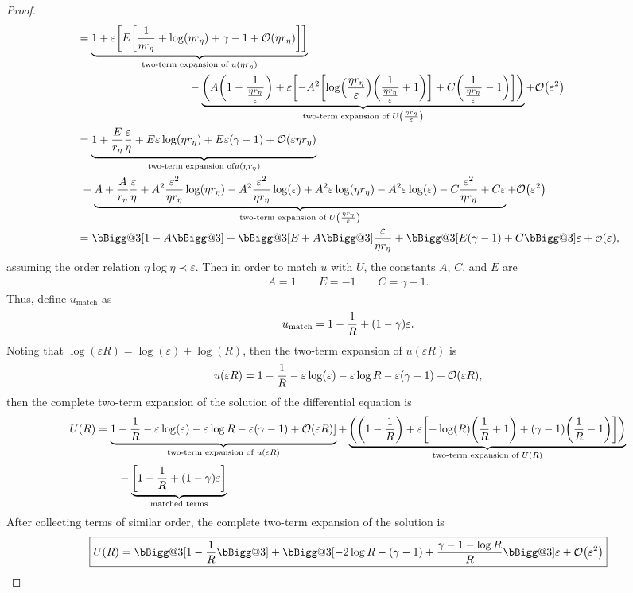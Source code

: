\documentclass{article} %
\makeatletter
\theoremstyle{plain}
\newcommand{\BIGG}{\bBigg@{3}}
\newcommand{\E}{\varepsilon}
\newcommand{\littleo}[1]{\text{\scriptsize$\mathcal{O}$}\qty(#1)}
\numberwithin{equation}{section} %
\numberwithin{figure}{section} %
\numberwithin{table}{section} %
\makeatother
\begin{document}
\begin{proof}
\begin{align*}
        &= \underbrace{1 + \E\qty[E\qty[\frac{1}{\eta r_\eta} + \log(\eta r_\eta) + \gamma - 1 + \order{\eta r_\eta}]]}_{\text{two-term expansion of } u(\eta r_\eta)} \\
        &\qquad\qquad\qquad\qquad\qquad - \underbrace{\qty(A\qty(1 - \frac{1}{\frac{\eta r_\eta}{\E}}) + \E\qty[-A^2\qty[\log(\frac{\eta r_\eta}{\E})\qty(\dfrac{1}{\frac{\eta r_\eta}{\E}} + 1)] + C\qty(\dfrac{1}{\frac{\eta r_\eta}{\E}} - 1)])}_{\text{two-term expansion of } U\qty(\frac{\eta r_\eta}{\E})} + \order{\E^2} \\
        &= \underbrace{1 + \frac{E}{r_\eta}\frac{\E}{\eta} + E\E\log(\eta r_\eta) + E\E\qty(\gamma - 1) + \order{\E\eta r_\eta}}_{\text{two-term expansion of} u(\eta r_\eta)} \\
        &\ - \underbrace{A + \frac{A}{r_\eta}\frac{\E}{\eta} + A^2\frac{\E^2}{\eta r_\eta}\log(\eta r_\eta) - A^2\frac{\E^2}{\eta r_\eta}\log(\E) + A^2\E\log(\eta r_\eta) - A^2\E\log(\E) - C \frac{\E^2}{\eta r_\eta} + C\E}_{\text{two-term expansion of } U\qty(\frac{\eta r_\eta}{\E})} + \order{\E^2} \\
        &= \BIGG[1 - A\BIGG] + \BIGG[E + A\BIGG]\frac{\E}{\eta r_\eta} + \BIGG[E\qty(\gamma - 1) + C\BIGG]\E + \littleo{\E},
    \end{align*}
    assuming the order relation $\eta \log\eta \prec \E$.  Then in order to match $u$ with $U$, the constants $A$, $C$, and $E$ are
    \begin{align*}
        A = 1 \qquad E = -1 \qquad C = \gamma - 1.
    \end{align*}
    Thus, define $u_\text{match}$ as
    \begin{align*}
        u_\text{match} = 1 - \frac{1}{R} + \qty(1 - \gamma)\E.
    \end{align*}
    Noting that $\log(\E R) = \log(\E) + \log(R)$, then the two-term expansion of $u(\E R)$ is
    \begin{align*}
        u(\E R) = 1 - \frac{1}{R} - \E \log(\E) - \E\log R - \E\qty(\gamma - 1) + \order{\E R},
    \end{align*}
    then the complete two-term expansion of the solution of the differential equation is
    \begin{align*}
        U(R) &= \underbrace{1 - \frac{1}{R} - \E \log(\E) - \E\log R - \E\qty(\gamma - 1) + \order{\E R}]}_{\text{two-term expansion of } u(\E R)} + \underbrace{\qty(\qty(1 - \frac{1}{R}) + \E\qty[-\log(R)\qty(\dfrac{1}{R} + 1) + \qty(\gamma - 1)\qty(\dfrac{1}{R} - 1)])}_{\text{two-term expansion of } U(R)} \\
        &\qquad - \underbrace{\qty[1 - \frac{1}{R} + \qty(1 - \gamma)\E]}_{\text{matched terms}}
    \end{align*}
    After collecting terms of similar order, the complete two-term expansion of the solution is
    \begin{align*}
        \boxed{U(R) = \BIGG[1 - \frac{1}{R}\BIGG] + \BIGG[-2\log R - (\gamma - 1) + \frac{\gamma - 1 - \log R}{R}\BIGG]\E + \order{\E^2}}
    \end{align*}
\end{proof}
    
\end{document}

